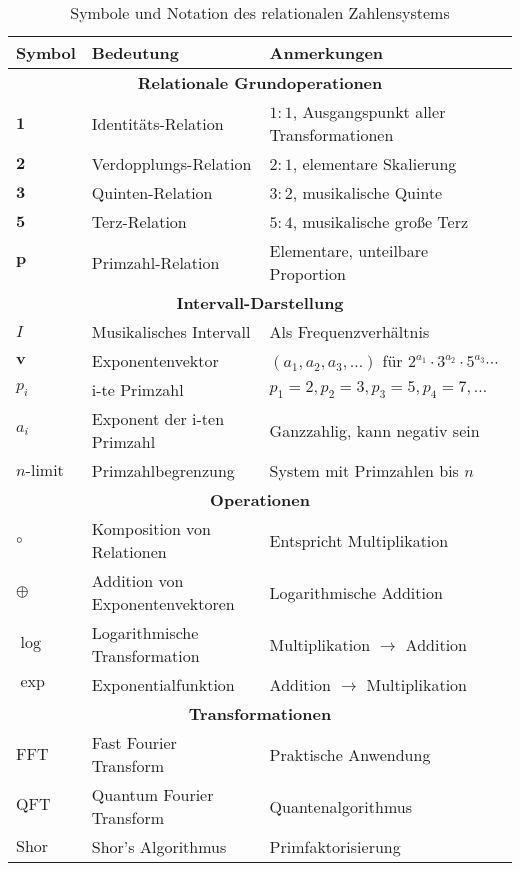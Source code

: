 \documentclass[11pt,a4paper]{article}
\newcommand{\primrel}[1]{\mathbf{#1}}
\newcommand{\vect}[1]{\boldsymbol{#1}}
\begin{document}
	{\small
		\begin{table}[htbp]
			\centering
			\begin{adjustbox}{width=0.98\textwidth}
				\begin{tabular}{lll}
					\toprule
					\textbf{Symbol} & \textbf{Bedeutung} & \textbf{Anmerkungen} \\
					\midrule
					\multicolumn{3}{c}{\textbf{Relationale Grundoperationen}} \\
					$\primrel{1}$ & Identitäts-Relation & $1:1$, Ausgangspunkt aller Transformationen \\
					$\primrel{2}$ & Verdopplungs-Relation & $2:1$, elementare Skalierung \\
					$\primrel{3}$ & Quinten-Relation & $3:2$, musikalische Quinte \\
					$\primrel{5}$ & Terz-Relation & $5:4$, musikalische große Terz \\
					$\primrel{p}$ & Primzahl-Relation & Elementare, unteilbare Proportion \\
					\midrule
					\multicolumn{3}{c}{\textbf{Intervall-Darstellung}} \\
					$I$ & Musikalisches Intervall & Als Frequenzverhältnis \\
					$\vect{v}$ & Exponentenvektor & $(a_1, a_2, a_3, \ldots)$ für $2^{a_1} \cdot 3^{a_2} \cdot 5^{a_3} \cdots$ \\
					$p_i$ & i-te Primzahl & $p_1=2, p_2=3, p_3=5, p_4=7, \ldots$ \\
					$a_i$ & Exponent der i-ten Primzahl & Ganzzahlig, kann negativ sein \\
					$n\text{-limit}$ & Primzahlbegrenzung & System mit Primzahlen bis $n$ \\
					\midrule
					\multicolumn{3}{c}{\textbf{Operationen}} \\
					$\circ$ & Komposition von Relationen & Entspricht Multiplikation \\
					$\oplus$ & Addition von Exponentenvektoren & Logarithmische Addition \\
					$\log$ & Logarithmische Transformation & Multiplikation $\to$ Addition \\
					$\exp$ & Exponentialfunktion & Addition $\to$ Multiplikation \\
					\midrule
					\multicolumn{3}{c}{\textbf{Transformationen}} \\
					$\text{FFT}$ & Fast Fourier Transform & Praktische Anwendung \\
					$\text{QFT}$ & Quantum Fourier Transform & Quantenalgorithmus \\
					$\text{Shor}$ & Shor's Algorithmus & Primfaktorisierung \\
					\bottomrule
				\end{tabular}
			\end{adjustbox}
			\caption{Symbole und Notation des relationalen Zahlensystems}
			\label{tab:symbole}
		\end{table}
	}
	
\end{document}
